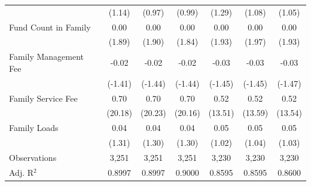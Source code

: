{\begin{tabular}{l*{6}{c}}
                    &      (1.14)         &      (0.97)         &      (0.99)         &      (1.29)         &      (1.08)         &      (1.05)         \\
\addlinespace
Fund Count in Family&        0.00\sym{*}  &        0.00\sym{*}  &        0.00\sym{*}  &        0.00\sym{*}  &        0.00\sym{*}  &        0.00\sym{*}  \\
                    &      (1.89)         &      (1.90)         &      (1.84)         &      (1.93)         &      (1.97)         &      (1.93)         \\
\addlinespace
Family Management Fee&       -0.02         &       -0.02         &       -0.02         &       -0.03         &       -0.03         &       -0.03         \\
                    &     (-1.41)         &     (-1.44)         &     (-1.44)         &     (-1.45)         &     (-1.45)         &     (-1.47)         \\
\addlinespace
Family Service Fee  &        0.70\sym{***}&        0.70\sym{***}&        0.70\sym{***}&        0.52\sym{***}&        0.52\sym{***}&        0.52\sym{***}\\
                    &     (20.18)         &     (20.23)         &     (20.16)         &     (13.51)         &     (13.59)         &     (13.54)         \\
\addlinespace
Family Loads        &        0.04         &        0.04         &        0.04         &        0.05         &        0.05         &        0.05         \\
                    &      (1.31)         &      (1.30)         &      (1.30)         &      (1.02)         &      (1.04)         &      (1.03)         \\
\midrule
Observations        &       3,251         &       3,251         &       3,251         &       3,230         &       3,230         &       3,230         \\
Adj. R$^{2}$        &      0.8997         &      0.8997         &      0.9000         &      0.8595         &      0.8595         &      0.8600         \\
\bottomrule
\end{tabular}
}
